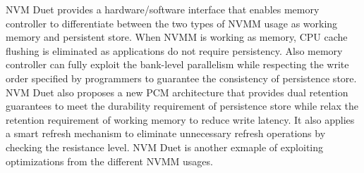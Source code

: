 NVM Duet provides a hardware/software interface that enables memory controller
to differentiate between the two types of NVMM usage as working memory and
persistent store. When NVMM is working as memory, CPU cache flushing is
eliminated as applications do not require persistency. Also memory controller
can fully exploit the bank-level parallelism while respecting the write order 
specified by programmers to guarantee the consistency of persistence store.
NVM Duet also proposes a new PCM architecture that provides dual retention
guarantees to meet the durability requirement of persistence store while relax
the retention requirement of working memory to reduce write latency. It also
applies a smart refresh mechanism to eliminate unnecessary refresh operations
by checking the resistance level. NVM Duet is another exmaple of exploiting
optimizations from the different NVMM usages.
